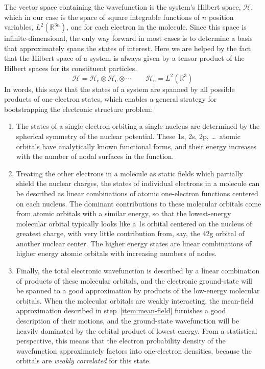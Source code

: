 The vector space containing the wavefunction is the system's Hilbert space,
\(\mathcal{H}\), which in our case is the space of square integrable functions
of \(n\) position variables,
\(
    L^2(\mathbb{R}^{3n})
\),
one for each electron in the molecule.
Since this space is infinite-dimensional, the only way forward in most cases is
to determine a basis that approximately spans the states of interest.
Here we are helped by the fact that the Hilbert space of a system is always
given by a tensor product of the Hilbert spaces for its constituent particles.
\begin{equation}
    \mathcal{H}
    =
    \mathcal{H}_\mathrm{e}
    \otimes
    \mathcal{H}_\mathrm{e}
    \otimes
    \cdots
    \qquad
    \mathcal{H}_\mathrm{e}
    =
    L^2(\mathbb{R}^3)
\end{equation}
In words, this says that the states of a system are spanned by all possible
products of one-electron states, which enables a general strategy for
bootstrapping the electronic structure problem:
\begin{enumerate}
    \item
        \label{item:atomic-orbitals}
        The states of a single electron orbiting a single nucleus are determined
        by the spherical symmetry of the nuclear potential.
        These 1s, 2s, 2p, \dots\ atomic orbitals have analytically known
        functional forms, and their energy increases with the number of nodal
        surfaces in the function.
    \item
        \label{item:mean-field}
        Treating the other electrons in a molecule as static fields which
        partially shield the nuclear charges, the states of individual electrons
        in a molecule can be described as linear combinations of atomic
        one-electron functions centered on each nucleus.
        The dominant contributions to these molecular orbitals come from atomic
        orbitals with a similar energy, so that the lowest-energy molecular
        orbital typically looks like a 1s orbital centered on the nucleus of
        greatest charge, with very little contribution from, say, the 42g
        orbital of another nuclear center.
        The higher energy states are linear combinations of higher energy atomic
        orbitals with increasing numbers of nodes.
    \item
        \label{item:full-ci}
        Finally, the total electronic wavefunction is described by a linear
        combination of products of these molecular orbitals, and the electronic
        ground-state will be spanned to a good approximation by products of the
        low-energy molecular orbitals.
        When the molecular orbitals are weakly interacting, the mean-field
        approximation described in step~\ref{item:mean-field} furnishes a good
        description of their motions, and the ground-state wavefunction will be
        heavily dominated by the orbital product of lowest energy.
        From a statistical perspective, this means that the electron probability
        density of the wavefunction approximately factors into one-electron
        densities, because the orbitals are {\itshape weakly correlated} for
        this state.
\end{enumerate}
